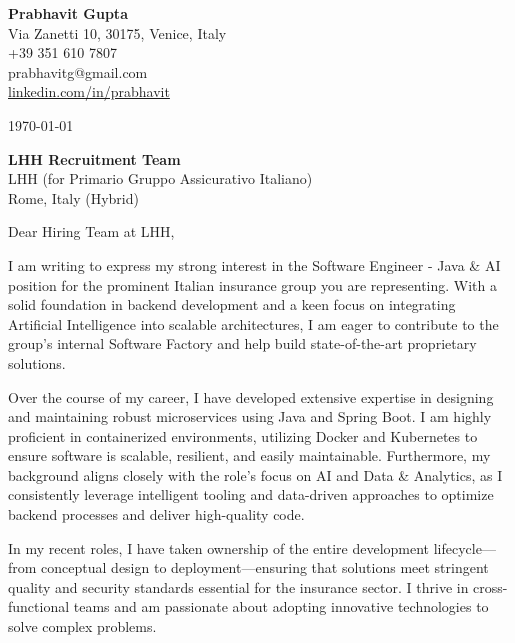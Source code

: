 \documentclass[11pt,a4paper]{article}
\begin{document}
\thispagestyle{empty}

\begin{flushleft}
\textbf{Prabhavit Gupta} \\
Via Zanetti 10, 30175, Venice, Italy \\
+39 351 610 7807 \\
prabhavitg@gmail.com \\
\href{https://www.linkedin.com/in/prabhavit/}{linkedin.com/in/prabhavit}
\end{flushleft}

\vspace{2em}
\today

\vspace{2em}
\begin{flushleft}
\textbf{LHH Recruitment Team} \\
LHH (for Primario Gruppo Assicurativo Italiano) \\
Rome, Italy (Hybrid)
\end{flushleft}

\vspace{2em}
\noindent Dear Hiring Team at LHH,

\vspace{1em}
\noindent I am writing to express my strong interest in the Software Engineer - Java \& AI position for the prominent Italian insurance group you are representing. With a solid foundation in backend development and a keen focus on integrating Artificial Intelligence into scalable architectures, I am eager to contribute to the group's internal Software Factory and help build state-of-the-art proprietary solutions.

\vspace{1em}
\noindent Over the course of my career, I have developed extensive expertise in designing and maintaining robust microservices using Java and Spring Boot. I am highly proficient in containerized environments, utilizing Docker and Kubernetes to ensure software is scalable, resilient, and easily maintainable. Furthermore, my background aligns closely with the role's focus on AI and Data \& Analytics, as I consistently leverage intelligent tooling and data-driven approaches to optimize backend processes and deliver high-quality code.

\vspace{1em}
\noindent In my recent roles, I have taken ownership of the entire development lifecycle—from conceptual design to deployment—ensuring that solutions meet stringent quality and security standards essential for the insurance sector. I thrive in cross-functional teams and am passionate about adopting innovative technologies to solve complex problems.
\end{document}
